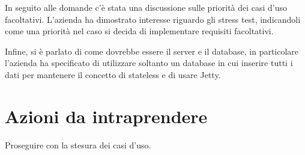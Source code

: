 \documentclass[12pt]{article}
\begin{document}
        \noindent     
        In seguito alle domande c'è stata una discussione sulle priorità dei casi d'uso facoltativi. L'azienda ha dimostrato interesse riguardo gli stress test, indicandoli come una priorità nel caso si decida di implementare requisiti facoltativi.

        \vspace{0.3cm}
        \noindent
        Infine, si è parlato di come dovrebbe essere il server e il database, in particolare l'azienda ha specificato di utilizzare soltanto un database in cui inserire tutti i dati per mantenere il concetto di stateless e di usare Jetty.
    
    \section{Azioni da intraprendere}
        Proseguire con la stesura dei casi d'uso.
\end{document}
